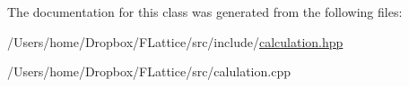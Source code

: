 The documentation for this class was generated from the following files\+:\begin{DoxyCompactItemize}
\item 
/\+Users/home/\+Dropbox/\+F\+Lattice/src/include/\mbox{\hyperlink{calculation_8hpp}{calculation.\+hpp}}\item 
/\+Users/home/\+Dropbox/\+F\+Lattice/src/calulation.\+cpp\end{DoxyCompactItemize}
